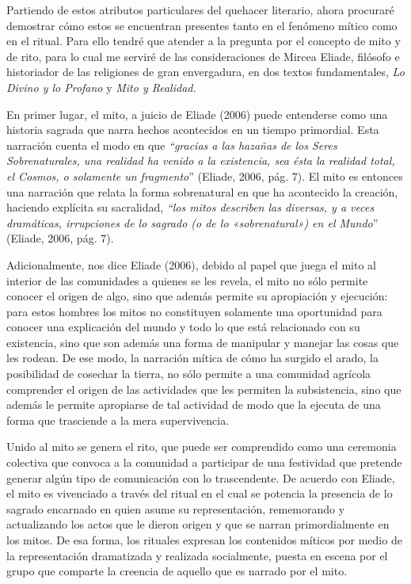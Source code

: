 \begin{refsection}
Partiendo de estos atributos particulares del quehacer literario, ahora procuraré demostrar cómo estos se encuentran presentes tanto en el fenómeno mítico como en el ritual. Para ello tendré que atender a la pregunta por el concepto de mito y de rito, para lo cual me serviré de las consideraciones de Mircea Eliade, filósofo e historiador de las religiones de gran envergadura, en dos textos fundamentales, \emph{Lo Divino y lo Profano} y \emph{Mito y Realidad. }

En primer lugar, el mito, a juicio de Eliade (2006) puede entenderse como una historia sagrada que narra hechos acontecidos en un tiempo primordial. Esta narración cuenta el modo en que \emph{``gracias a las hazañas de los Seres Sobrenaturales, una realidad ha venido a la existencia, sea ésta la realidad total, el Cosmos, o solamente un fragmento}'' (Eliade, 2006, pág. 7). El mito es entonces una narración que relata la forma sobrenatural en que ha acontecido la creación, haciendo explícita su sacralidad, \emph{``los mitos describen las diversas, y a veces dramáticas, irrupciones de lo sagrado (o de lo «sobrenatural») en el Mundo}'' (Eliade, 2006, pág. 7).

Adicionalmente, nos dice Eliade (2006), debido al papel que juega el mito al interior de las comunidades a quienes se les revela, el mito no sólo permite conocer el origen de algo, sino que además permite su apropiación y ejecución: para estos hombres los mitos no constituyen solamente una oportunidad para conocer una explicación del mundo y todo lo que está relacionado con su existencia, sino que son además una forma de manipular y manejar las cosas que les rodean. De ese modo, la narración mítica de cómo ha surgido el arado, la posibilidad de cosechar la tierra, no sólo permite a una comunidad agrícola comprender el origen de las actividades que les permiten la subsistencia, sino que además le permite apropiarse de tal actividad de modo que la ejecuta de una forma que trasciende a la mera supervivencia.

Unido al mito se genera el rito, que puede ser comprendido como una ceremonia colectiva que convoca a la comunidad a participar de una festividad que pretende generar algún tipo de comunicación con lo trascendente. De acuerdo con Eliade, el mito es vivenciado a través del ritual en el cual se potencia la presencia de lo sagrado encarnado en quien asume su representación, rememorando y actualizando los actos que le dieron origen y que se narran primordialmente en los mitos. De esa forma, los rituales expresan los contenidos míticos por medio de la representación dramatizada y realizada socialmente, puesta en escena por el grupo que comparte la creencia de aquello que es narrado por el mito.


\end{refsection}
